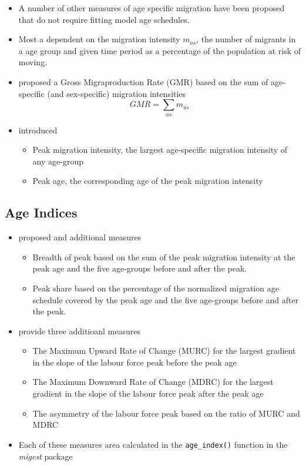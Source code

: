 \documentclass[
]{book}
\providecommand{\tightlist}{%
  \setlength{\itemsep}{0pt}\setlength{\parskip}{0pt}}
\begin{document}
\begin{itemize}
\tightlist
\item
  A number of other measures of age specific migration have been proposed that do not require fitting model age schedules.
\item
  Most a dependent on the migration intensity \(m_{as}\), the number of migrants in a age group and given time period as a percentage of the population at risk of moving.
\item
  \citet{Rogers1975} proposed a Gross Migraproduction Rate (GMR) based on the sum of age-specific (and sex-specific) migration intensities
  \[
  GMR = \sum_{as} m_{as}
  \]
\item
  \citet{Bell2002} introduced

  \begin{itemize}
  \tightlist
  \item
    Peak migration intensity, the largest age-specific migration intensity of any age-group
  \item
    Peak age, the corresponding age of the peak migration intensity
  \end{itemize}
\end{itemize}

\hypertarget{age-indices-3}{%
\subsection{Age Indices}\label{age-indices-3}}

\begin{itemize}
\tightlist
\item
  \citet{Bell2009} proposed and additional measures

  \begin{itemize}
  \tightlist
  \item
    Breadth of peak based on the sum of the peak migration intensity at the peak age and the five age-groups before and after the peak.
  \item
    Peak share based on the percentage of the normalized migration age schedule covered by the peak age and the five age-groups before and after the peak.
  \end{itemize}
\item
  \citet{Bernard2014} provide three additioanl measures

  \begin{itemize}
  \tightlist
  \item
    The Maximum Upward Rate of Change (MURC) for the largest gradient in the slope of the labour force peak before the peak age
  \item
    The Maximum Downward Rate of Change (MDRC) for the largest gradient in the slope of the labour force peak after the peak age
  \item
    The asymmetry of the labour force peak based on the ratio of MURC and MDRC
  \end{itemize}
\item
  Each of these measures area calculated in the \texttt{age\_index()} function in the \emph{migest} package
\end{itemize}
\end{document}
